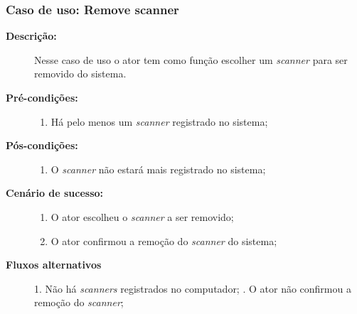 \subsubsection{Caso de uso: Remove scanner}
\begin{description}
    \item[{\bf Descrição:}] Nesse caso de uso o ator tem como função escolher um {\it scanner} para ser removido do sistema.
    \item[{\bf Pré-condições:}]
        \begin{enumerate}
            \item Há pelo menos um {\it scanner} registrado no sistema;
        \end{enumerate}
    \item[{\bf Pós-condições:}] 
        \begin{enumerate}
            \item O {\it scanner} não estará mais registrado no sistema;
        \end{enumerate}
    
    \item[{\bf Cenário de sucesso:}]
        \begin{enumerate}
            \item O ator escolheu o  {\it scanner} a ser removido;
            \item O ator confirmou a remoção do {\it scanner} do sistema;
        \end{enumerate}

    \item[{\bf Fluxos alternativos}]
        1. Não há {\it scanners} registrados no computador; . O ator não confirmou a remoção do {\it scanner};
\end{description}

